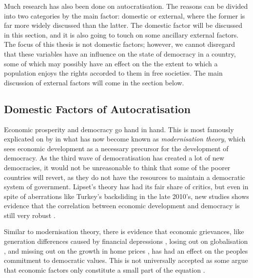 Much research has also been done on autocratisation. The reasons can be divided into two categories by the main factor: domestic or external, where the former is far more widely discussed than the latter. The domestic factor will be discussed in this section, and it is also going to touch on some ancillary external factors. The focus of this thesis is not domestic factors; however, we cannot disregard that these variables have an influence on the state of democracy in a country, some of which may possibly have an effect on the the extent to which a population enjoys the rights accorded to them in free societies. The main discussion of external factors will come in the section below.

\subsection{Domestic Factors of Autocratisation}
Economic prosperity and democracy go hand in hand. This is most famously explicated on by \citet{lipset_social_1959} in what has now become known as \textit{modernisation theory}, which sees economic development as a necessary precursor for the development of democracy. As the third wave of democratisation has created a lot of new democracies, it would not be unreasonable to think that some of the poorer countries will revert, as they do not have the resources to maintain a democratic system of government. Lipset's theory has had its fair share of critics, but even in spite of aberrations like Turkey's backsliding in the late 2010's, new studies shows evidence that the correlation between economic development and democracy is still very robust \citep{brownlee_limited_2017}.

Similar to modernisation theory, there is evidence that economic grievances, like generation differences caused by financial depressions \citep[pp. 132-174]{norris_cultural_2019}, losing out on globalisation \citep{ballard-rosa_economic_2021}, and missing out on the growth in home prices \citep{ansell_sheltering_2022}, has had an effect on the peoples commitment to democratic values. This is not universally accepted as some argue that economic factors only constitute a small part of the equation \citep{margalit_economic_2019}.

